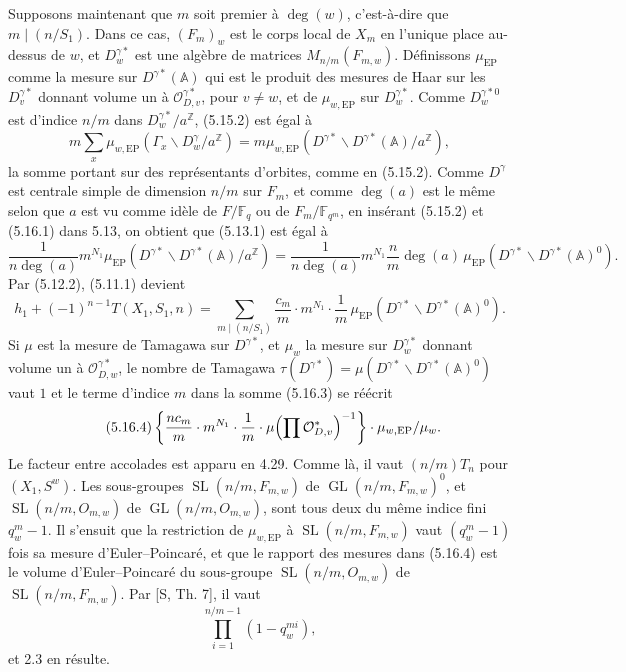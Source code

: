 \documentclass[10pt]{article}
\newcommand{\Fq}{\mathbb F_q}
\newcommand{\Fqm}{\mathbb F_{q^m}}
\newcommand{\Z}{\mathbb Z}
\newcommand{\Adele}{\mathbb A}
\newcommand{\GL}{\operatorname{GL}}
\newcommand{\SL}{\operatorname{SL}}
\newcommand{\degm}{\operatorname{deg}}
\theoremstyle{deligne}
\newcommand{\heading}[1]{\vspace{0.7em}\noindent{\bfseries #1}\quad}
\begin{document}
\heading{5.16.} Supposons maintenant que $m$ soit premier à $\degm(w)$, c'est-à-dire que $m\mid(n/S_1)$. Dans ce cas, $(F_m)_w$ est le corps local de $X_m$ en l'unique place au-dessus de $w$, et $D_w^{\gamma *}$ est une algèbre de matrices $M_{n/m}(F_{m,w})$. Définissons $\mu_{\mathrm{EP}}$ comme la mesure sur $D^{\gamma *}(\Adele)$ qui est le produit des mesures de Haar sur les $D_v^{\gamma *}$ donnant volume un à $\mathcal O_{D,v}^{\gamma *}$, pour $v\ne w$, et de $\mu_{w,\mathrm{EP}}$ sur $D_w^{\gamma *}$. Comme $D_w^{\gamma *0}$ est d'indice $n/m$ dans $D_w^{\gamma *}/a^\Z$, (5.15.2) est égal à
\begin{equation}\tag{5.16.1}
m\sum_x \mu_{w,\mathrm{EP}}(\Gamma_x\backslash D_w^\gamma/a^\Z)
=m\mu_{w,\mathrm{EP}}(D^{\gamma *}\backslash D^{\gamma *}(\Adele)/a^\Z),
\end{equation}
la somme portant sur des représentants d'orbites, comme en (5.15.2). Comme $D^\gamma$ est centrale simple de dimension $n/m$ sur $F_m$, et comme $\degm(a)$ est le même selon que $a$ est vu comme id\`ele de $F/\Fq$ ou de $F_m/\Fqm$, en insérant (5.15.2) et (5.16.1) dans 5.13, on obtient que (5.13.1) est égal à
\begin{equation}\tag{5.16.2}
\frac{1}{n\degm(a)}m^{N_1}\mu_{\mathrm{EP}}(D^{\gamma *}\backslash D^{\gamma *}(\Adele)/a^\Z)
=\frac{1}{n\degm(a)}m^{N_1}\frac{n}{m}\degm(a)\,
\mu_{\mathrm{EP}}(D^{\gamma *}\backslash D^{\gamma *}(\Adele)^0).
\end{equation}
Par (5.12.2), (5.11.1) devient
\begin{equation}\tag{5.16.3}
h_1+(-1)^{n-1}T(X_1,S_1,n)
=\sum_{m\mid(n/S_1)}\frac{c_m}{m}\cdot m^{N_1}\cdot\frac1m\,
\mu_{\mathrm{EP}}(D^{\gamma *}\backslash D^{\gamma *}(\Adele)^0).
\end{equation}
Si $\mu$ est la mesure de Tamagawa sur $D^{\gamma *}$, et $\mu_w$ la mesure sur $D_w^{\gamma *}$ donnant volume un à $\mathcal O_{D,w}^{\gamma *}$, le nombre de Tamagawa $\tau(D^{\gamma *})=\mu(D^{\gamma *}\backslash D^{\gamma *}(\Adele)^0)$ vaut $1$ et le terme d'indice $m$ dans la somme (5.16.3) se réécrit
\begin{equation}\tag{5.16.4}
\left\{\frac{n c_m}{m}\cdot m^{N_1}\cdot\frac1m\cdot
\mu\Bigl(\prod\mathcal O_{D,v}^*\Bigr)^{-1}\right\}\cdot\mu_{w,\mathrm{EP}}/\mu_w.
\end{equation}
Le facteur entre accolades est apparu en 4.29. Comme là, il vaut $(n/m)T_n$ pour $(X_1,S^w)$. Les sous-groupes $\SL(n/m,F_{m,w})$ de $\GL(n/m,F_{m,w})^0$, et $\SL(n/m,O_{m,w})$ de $\GL(n/m,O_{m,w})$, sont tous deux du même indice fini $q_w^m-1$. Il s'ensuit que la restriction de $\mu_{w,\mathrm{EP}}$ à $\SL(n/m,F_{m,w})$ vaut $(q_w^m-1)$ fois sa mesure d'Euler--Poincaré, et que le rapport des mesures dans (5.16.4) est le volume d'Euler--Poincaré du sous-groupe $\SL(n/m,O_{m,w})$ de $\SL(n/m,F_{m,w})$. Par [S, Th. 7], il vaut
\[
\prod_{i=1}^{n/m-1}(1-q_w^{mi}),
\]
et 2.3 en résulte.
\end{document}
